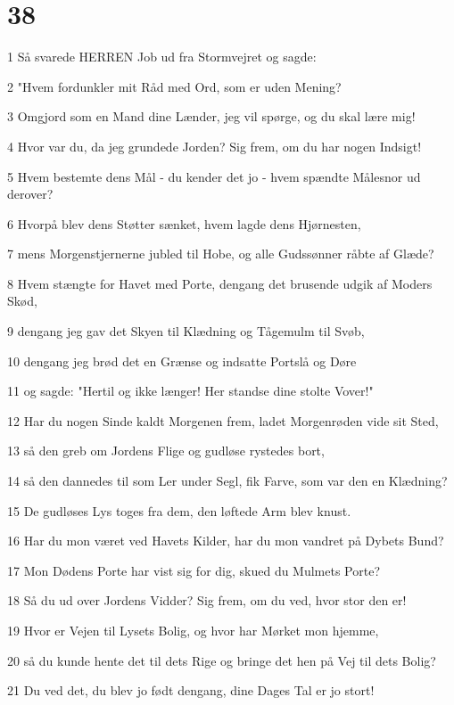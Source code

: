 \chapter{38}

\par 1 Så svarede HERREN Job ud fra Stormvejret og sagde:
\par 2 "Hvem fordunkler mit Råd med Ord, som er uden Mening?
\par 3 Omgjord som en Mand dine Lænder, jeg vil spørge, og du skal lære mig!
\par 4 Hvor var du, da jeg grundede Jorden? Sig frem, om du har nogen Indsigt!
\par 5 Hvem bestemte dens Mål - du kender det jo - hvem spændte Målesnor ud derover?
\par 6 Hvorpå blev dens Støtter sænket, hvem lagde dens Hjørnesten,
\par 7 mens Morgenstjernerne jubled til Hobe, og alle Gudssønner råbte af Glæde?
\par 8 Hvem stængte for Havet med Porte, dengang det brusende udgik af Moders Skød,
\par 9 dengang jeg gav det Skyen til Klædning og Tågemulm til Svøb,
\par 10 dengang jeg brød det en Grænse og indsatte Portslå og Døre
\par 11 og sagde: "Hertil og ikke længer! Her standse dine stolte Vover!"
\par 12 Har du nogen Sinde kaldt Morgenen frem, ladet Morgenrøden vide sit Sted,
\par 13 så den greb om Jordens Flige og gudløse rystedes bort,
\par 14 så den dannedes til som Ler under Segl, fik Farve, som var den en Klædning?
\par 15 De gudløses Lys toges fra dem, den løftede Arm blev knust.
\par 16 Har du mon været ved Havets Kilder, har du mon vandret på Dybets Bund?
\par 17 Mon Dødens Porte har vist sig for dig, skued du Mulmets Porte?
\par 18 Så du ud over Jordens Vidder? Sig frem, om du ved, hvor stor den er!
\par 19 Hvor er Vejen til Lysets Bolig, og hvor har Mørket mon hjemme,
\par 20 så du kunde hente det til dets Rige og bringe det hen på Vej til dets Bolig?
\par 21 Du ved det, du blev jo født dengang, dine Dages Tal er jo stort!
